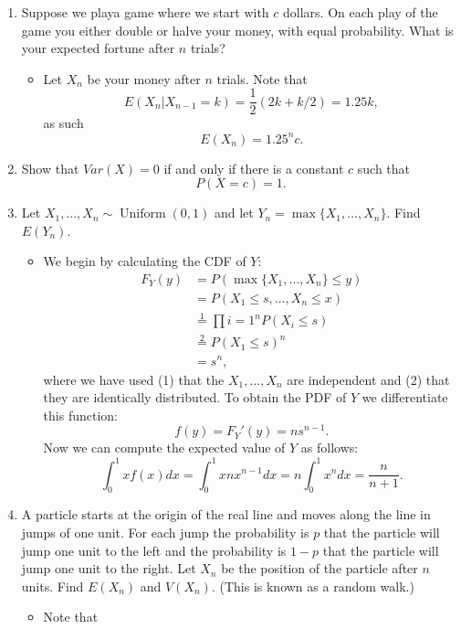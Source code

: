 \documentclass{article}
\begin{document}
\begin{enumerate}
	\item Suppose we playa game where we start with $c$ dollars. On each play of the game you either double or halve your money, with equal probability. What is your expected fortune after $n$ trials?
		\begin{itemize}
			\item Let $X_n$ be your money after $n$ trials. Note that
			$$
			E(X_n|X_{n - 1} = k) = \frac{1}{2}(2k + k / 2) = 1.25k,
			$$
			as such
			$$
			E(X_n) = 1.25^n c.
			$$
		\end{itemize}
	\item Show that $Var(X) = 0$ if and only if there is a constant $c$ such that
	$$
	P(X = c) = 1.
	$$
	\item Let $X_1, \dots, X_n \sim \operatorname{Uniform}(0, 1)$ and let $Y_n = \max \{X_1, \dots, X_n\}$. Find $E(Y_n)$.
		\begin{itemize}
			\item We begin by calculating the CDF of $Y$:
			$$
			\begin{aligned}
				F_Y(y) &= P(\max\{X_1, \dots, X_n\} \leq y) \\
				&= P(X_1 \leq s, \dots, X_n \leq x) \\
				&\overset{1}{=} \prod{i = 1}^n P(X_i \leq s) \\
				&\overset{2}{=} P(X_1 \leq s)^n \\
				&= s^n,
			\end{aligned}
			$$
			where we have used (1) that the $X_1, \dots, X_n$ are independent and (2) that they are identically distributed. To obtain the PDF of $Y$ we differentiate this function:
			$$
			f(y) = F_Y'(y) = n s^{n - 1}.
			$$
			Now we can compute the expected value of $Y$ as follows:
			$$
			\int_0^1 x f(x) dx = \int_0^1 x n x^{n - 1} dx = n \int_0^1 x^n dx = \frac{n}{n + 1}. 
			$$
		\end{itemize}
	\item A particle starts at the origin of the real line and moves along the line in jumps of one unit. For each jump the probability is $p$ that the particle will jump one unit to the left and the probability is $1-p$ that the particle
	will jump one unit to the right. Let $X_n$ be the position of the particle after $n$ units. Find $E(X_n)$ and $V(X_n)$. (This is known as a random walk.)
		\begin{itemize}
			\item Note that
			$$
			\begin{aligned}

\end{aligned}$$
\end{itemize}
\end{enumerate}
\end{document}
